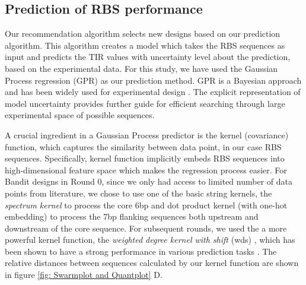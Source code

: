 \documentclass{article}
\begin{document}
\subsection{Prediction of RBS performance}

Our recommendation algorithm selects new designs based on our prediction algorithm.
This algorithm creates a model which takes the RBS sequences as input and predicts the TIR values with uncertainty level about the prediction, based on the experimental data.
For this study, we have used the Gaussian Process regression (GPR) as our prediction method.
GPR is a Bayesian approach and has been widely used for experimental design \cite{srinivas2012information, romero_navigating_2013}.
The explicit representation of model uncertainty provides further guide for efficient searching through large experimental space of possible sequences.

A crucial ingredient in a Gaussian Process predictor \cite{Rasmussen2004} is the kernel (covariance) function, which captures the similarity between data point, in our case RBS sequences.
Specifically, kernel function implicitly embeds RBS sequences into high-dimensional feature space which makes the regression process easier.
For Bandit designs in Round 0, since we only had access to limited number of data points from literature, we chose to use one of the basic string kernels, the \textit{spectrum kernel} \cite{leslie2001spectrum} to process the core 6bp and dot product kernel \cite{Rasmussen2004} (with one-hot embedding) to process the 7bp flanking sequences both upstream and downstream of the core sequence.
For subsequent rounds, we used the a more powerful kernel function, the \textit{weighted degree kernel with shift} (wds) \cite{ratsch_rase_2005_wds}, which has been shown to have a strong performance in various prediction tasks \cite{Ben-Hur2008}.
The relative distances between sequences calculated by our kernel function are shown in figure \ref{fig: Swarmplot and Quantplot} D.
\end{document}
